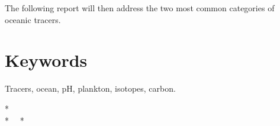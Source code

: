   The following report will then address the two most common categories of oceanic tracers.

\section*{Keywords}
  Tracers, ocean, pH, plankton, isotopes, carbon.


  \vspace{3em}
\begin{center}
  \begin{Large}
* \\
*  \ \ *
\end{Large}
\end{center}



